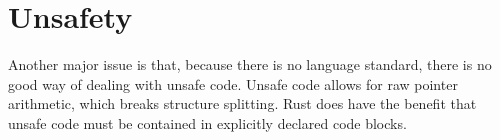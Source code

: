 \documentclass[12pt,oneside]{book}
\newcommand{\mirname}{{\texttt{MIR}}}
\def \mir {\mirname{}\xspace}
\begin{document}
\section{Unsafety}
\label{sec:unsafe}


Another major issue is that, because there is no language standard, there is no
good way of dealing with unsafe code. Unsafe code allows for raw pointer
arithmetic, which breaks structure splitting. Rust does have the benefit that
unsafe code must be contained in explicitly declared code blocks.








\end{document}
